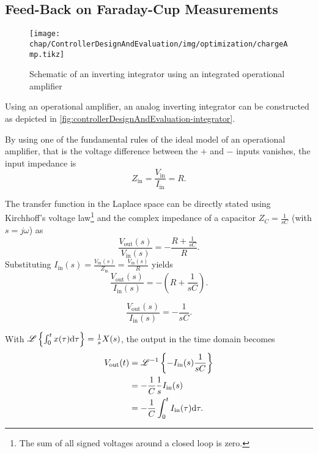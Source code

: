 \subsection{Feed-Back on Faraday-Cup Measurements}




\begin{figure}[tb]
	\centering
	\texttt{[image: chap/ControllerDesignAndEvaluation/img/optimization/chargeAmp.tikz]}
	\caption{Schematic of an inverting integrator using an integrated operational amplifier}
	\label{fig:controllerDesignAndEvaluation-integrator}
\end{figure}

Using an operational amplifier, an analog inverting integrator can be constructed as depicted in \autoref{fig:controllerDesignAndEvaluation-integrator}.\cite[p.~230]{Horowitz2015}

By using one of the fundamental rules of the ideal model of an operational amplifier, that is the voltage difference between the $+$ and $-$ inputs vanishes, the input impedance is
\begin{equation}
Z_\text{in} = \frac{V_\text{in}}{I_\text{in}} = R.
\end{equation}

The transfer function in the Laplace space can be directly stated using Kirchhoff's voltage law\footnote{The sum of all signed voltages around a closed loop is zero.} and the complex impedance of a capacitor $Z_C=\frac{1}{sC}$ (with $s=j\omega$) as
\begin{equation}
\frac{V_\text{out}(s)}{V_\text{in}(s)} = -\frac{R+\frac{1}{sC}}{R}.
\end{equation}
Substituting $I_\text{in}(s)=\frac{V_\text{in}(s)}{Z_\text{in}} = \frac{V_\text{in}(s)}{R}$ yields
\begin{equation}
\frac{V_\text{out}(s)}{I_\text{in}(s)} = -\left(R+\frac{1}{sC}\right).
\end{equation}

\begin{equation}
\frac{V_\text{out}(s)}{I_\text{in}(s)} = -\frac{1}{sC}.
\end{equation}

With $\mathscr{L}\left\{\int_{0}^{t} x(\tau) \text{d}{\tau}\right\}=\frac{1}{s} X(s)$, the output in the time domain becomes
\begin{align}
V_\text{out}(t) &= \mathscr{L}^{-1}\left\{-I_\text{in}(s) \frac{1}{sC}\right\}\\
                &= -\frac{1}{C} \frac{1}{s} I_\text{in}(s)\\
                &= -\frac{1}{C} \int_{0}^{t} I_\text{in}(\tau) \text{d}{\tau}.
\end{align}

